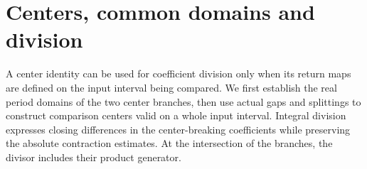 \section{Centers, common domains and division}\label{rw:centers}

A center identity can be used for coefficient division only when its
return maps are defined on the input interval being compared. We first
establish the real period domains of the two center branches, then use
actual gaps and splittings to construct comparison centers valid on a
whole input interval. Integral division expresses closing differences
in the center-breaking coefficients while preserving the absolute
contraction estimates. At the intersection of the branches, the divisor
includes their product generator.








